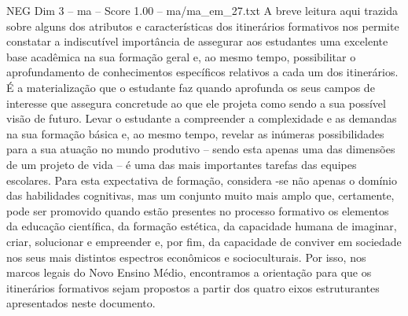 \begin{textsample}{NEG Dim 3 – ma – Score 1.00 – ma/ma\_em\_27.txt}
A breve leitura aqui trazida sobre alguns dos atributos e características dos itinerários formativos nos permite constatar a indiscutível importância de assegurar aos estudantes uma excelente base acadêmica na sua formação geral e, ao mesmo tempo, possibilitar o aprofundamento de conhecimentos específicos relativos a cada um dos itinerários.
É a materialização que o estudante faz quando aprofunda os seus campos de interesse que assegura concretude ao que ele projeta como sendo a sua possível visão de futuro.
Levar o estudante a compreender a complexidade e as demandas na sua formação básica e, ao mesmo tempo, revelar as inúmeras possibilidades para a sua atuação no mundo produtivo – sendo esta apenas uma das dimensões de um projeto de vida – é uma das mais importantes tarefas das equipes escolares.
Para esta expectativa de formação, considera -se não apenas o domínio das habilidades cognitivas, mas um conjunto muito mais amplo que, certamente, pode ser promovido quando estão presentes no processo formativo os elementos da educação científica, da formação estética, da capacidade humana de imaginar, criar, solucionar e empreender e, por fim, da capacidade de conviver em sociedade nos seus mais distintos espectros econômicos e socioculturais.
Por isso, nos marcos legais do Novo Ensino Médio, encontramos a orientação para que os itinerários formativos sejam propostos a partir dos quatro eixos estruturantes apresentados neste documento.

\end{textsample}
